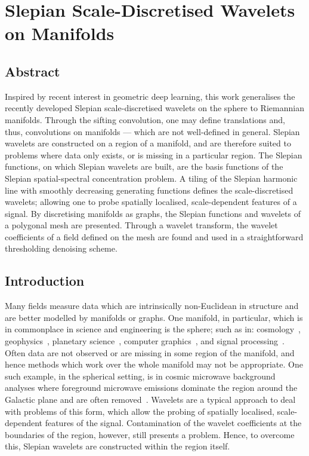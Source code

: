 \chapter{Slepian Scale-Discretised Wavelets on Manifolds}\label{sec:chapter4}

\section*{Abstract}

Inspired by recent interest in geometric deep learning, this work generalises the recently developed Slepian scale-discretised wavelets on the sphere to Riemannian manifolds.
Through the sifting convolution, one may define translations and, thus, convolutions on manifolds --- which are not well-defined in general.
Slepian wavelets are constructed on a region of a manifold, and are therefore suited to problems where data only exists, or is missing in a particular region.
The Slepian functions, on which Slepian wavelets are built, are the basis functions of the Slepian spatial-spectral concentration problem.
A tiling of the Slepian harmonic line with smoothly decreasing generating functions defines the scale-discretised wavelets; allowing one to probe spatially localised, scale-dependent features of a signal.
By discretising manifolds as graphs, the Slepian functions and wavelets of a polygonal mesh are presented.
Through a wavelet transform, the wavelet coefficients of a field defined on the mesh are found and used in a straightforward thresholding denoising scheme.

\section{Introduction}

Many fields measure data which are intrinsically non-Euclidean in structure and are better modelled by manifolds or graphs.
One manifold, in particular, which is in commonplace in science and engineering is the sphere; such as in: cosmology~\cite{Bennett1996}, geophysics~\cite{Simons2006}, planetary science~\cite{Turcotte1981}, computer graphics~\cite{Ramamoorthi2004}, and signal processing~\cite{Roddy2021a}.
Often data are not observed or are missing in some region of the manifold, and hence methods which work over the whole manifold may not be appropriate.
One such example, in the spherical setting, is in cosmic microwave background analyses where foreground microwave emissions dominate the region around the  Galactic plane and are often removed~\cite{Mortlock2002}.
Wavelets are a typical approach to deal with problems of this form, which allow the probing of spatially localised, scale-dependent features of the signal.
Contamination of the wavelet coefficients at the boundaries of the region, however, still presents a problem.
Hence, to overcome this, Slepian wavelets are constructed within the region itself.


